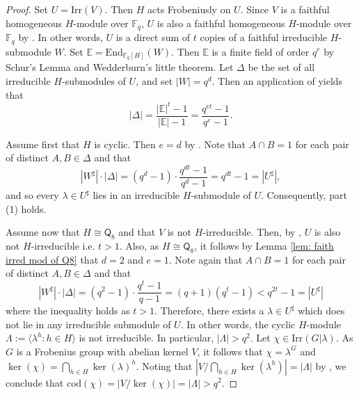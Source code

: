 \documentclass[9pt]{article}
\begin{document}
\begin{proof}
	Set $U=\mathrm{Irr}(V)$.
	  Then $H$ acts Frobeniusly on $U$.
	  Since $V$ is a faithful homogeneous $H$-module over $\mathbb{F}_q$,
	  $U$ is also a faithful homogeneous $H$-module over $\mathbb{F}_q$ 
	  by \cite[Lemma 1]{zhang2000}.
	  In other words, $U$ is a direct sum of $t$ copies of a faithful irreducible $H$-submodule $W$.
      Set $\mathbb{E}=\mathrm{End}_{\mathbb{F}_q[H]}(W)$.
	  	Then $\mathbb{E}$ is a finite field of order $q^{e}$ by Schur's Lemma and Wedderburn's little theorem.
	  Let $\Delta$ be the set of all irreducible $H$-submodules of $U$, and set $|W|=q^{d}$.
      Then an application of \cite[Chapter B, Proposition 8.2]{doerk1992} yields that  
	$$|\Delta|=\frac{|\mathbb{E}|^t-1}{|\mathbb{E}|-1}=\frac{q^{et}-1}{q^e-1}.$$


     Assume first that $H$ is cyclic.
	 Then $e=d$ by \cite[Chapter B, Theorem 9.8]{doerk1992}.
    Note that $A\cap B=1$ for each pair of distinct $A,B\in \Delta$ and that 
   \[
      |W^\sharp| \cdot |\Delta|=(q^{d}-1)\cdot \frac{q^{dt}-1}{q^d-1}=q^{dt}-1=|U^\sharp|,
   \]
	and so every $\lambda\in U^\sharp$ lies in an irreducible $H$-submodule of $U$.
	Consequently, part (1) holds.

    Assume now that $H\cong \mathsf{Q}_8$ and that $V$ is not $H$-irreducible.
	Then, by \cite[Lemma 1]{zhang2000}, $U$ is also not $H$-irreducible i.e. $t>1$.
    Also, as $H\cong \mathsf{Q}_8$, it follows by Lemma \ref{lem: faith irred mod of Q8} that $d=2$ and $e=1$.
    Note again that $A\cap B=1$ for each pair of distinct $A,B\in \Delta$
	and that
    \[
	  |W^\sharp| \cdot |\Delta|=(q^{2}-1)\cdot \frac{q^t-1}{q-1}=(q+1)(q^{t}-1)<q^{2t}-1=|U^\sharp|
	\]
	where the inequality holds as $t>1$.
    Therefore, there exists a $\lambda\in U^\sharp$ which does not lie in any irreducible submodule of $U$.
	In other words, the cyclic $H$-module $\Lambda:=\langle \lambda^h:h\in H\rangle$ is not irreducible.
	In particular, $|\Lambda|>q^{2}$. 
    Let $\chi\in \mathrm{Irr}(G|\lambda)$.
	As $G$ is a Frobenius group with abelian kernel $V$, it follows that $\chi=\lambda^G$ and $\ker(\chi)=\bigcap_{h\in H}\ker(\lambda)^h$.
    Noting that 
	$|V/\bigcap_{h\in H} \ker(\lambda^{h})|=|\Lambda|$ by \cite[\S 5, Theorem 5.5]{huppertcharactertheory},
	we conclude that $\mathrm{cod}(\chi)=|V/\ker(\chi)|=|\Lambda|>q^{2}$.
\end{proof}
\end{document}
